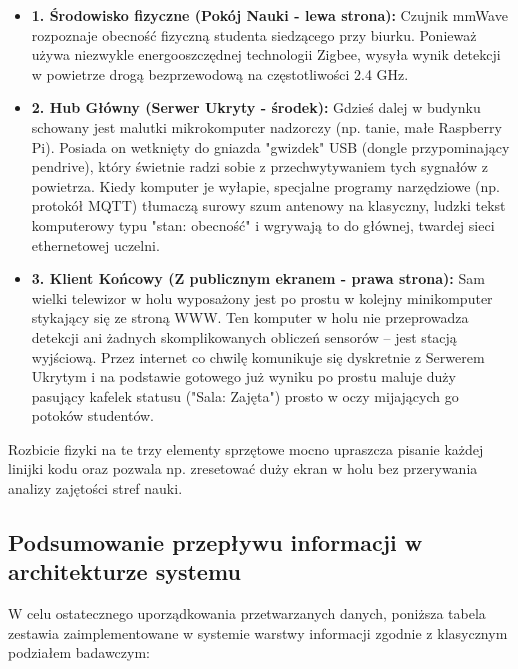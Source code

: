 \documentclass[14pt,a4paper]{extarticle}
\begin{document}
\begin{itemize}
    \item \textbf{1. Środowisko fizyczne (Pokój Nauki - lewa strona):} Czujnik mmWave rozpoznaje obecność fizyczną studenta siedzącego przy biurku. Ponieważ używa niezwykle energooszczędnej technologii Zigbee, wysyła wynik detekcji w powietrze drogą bezprzewodową na częstotliwości 2.4 GHz.
    \item \textbf{2. Hub Główny (Serwer Ukryty - środek):} Gdzieś dalej w budynku schowany jest malutki mikrokomputer nadzorczy (np. tanie, małe Raspberry Pi). Posiada on wetknięty do gniazda "gwizdek" USB (dongle przypominający pendrive), który świetnie radzi sobie z przechwytywaniem tych sygnałów z powietrza. Kiedy komputer je wyłapie, specjalne programy narzędziowe (np. protokół MQTT) tłumaczą surowy szum antenowy na klasyczny, ludzki tekst komputerowy typu "stan: obecność" i wgrywają to do głównej, twardej sieci ethernetowej uczelni.
    \item \textbf{3. Klient Końcowy (Z publicznym ekranem - prawa strona):} Sam wielki telewizor w holu wyposażony jest po prostu w kolejny minikomputer stykający się ze stroną WWW. Ten komputer w holu nie przeprowadza detekcji ani żadnych skomplikowanych obliczeń sensorów -- jest stacją wyjściową. Przez internet co chwilę komunikuje się dyskretnie z Serwerem Ukrytym i na podstawie gotowego już wyniku po prostu maluje duży pasujący kafelek statusu ("Sala: Zajęta") prosto w oczy mijających go potoków studentów.
\end{itemize}

Rozbicie fizyki na te trzy elementy sprzętowe mocno upraszcza pisanie każdej linijki kodu oraz pozwala np. zresetować duży ekran w holu bez przerywania analizy zajętości stref nauki.
\subsection{Podsumowanie przepływu informacji w architekturze systemu}

W celu ostatecznego uporządkowania przetwarzanych danych, poniższa tabela zestawia zaimplementowane w systemie warstwy informacji zgodnie z klasycznym podziałem badawczym:
\end{document}

